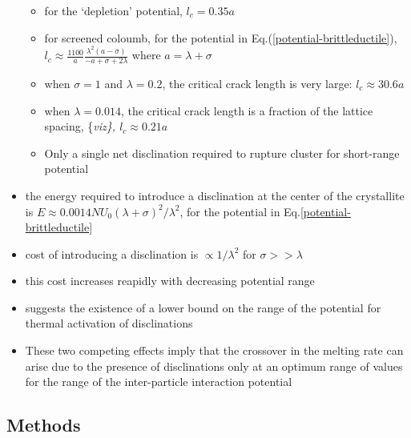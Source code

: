 \documentclass[11pt]{article}
\begin{document}
\begin{itemize}
\begin{itemize}
\item for the `depletion' potential, $l_c=0.35 a$\\
\label{sec-3-1-5-8-1}%
\item for screened coloumb, for the potential in Eq.(\ref{potential-brittleductile}), $l_c \approx \frac{1100}{a} \frac{\lambda^2 (a-\sigma)}{-a+\sigma+2\lambda}$ where $a=\lambda+\sigma$\\
\label{sec-3-1-5-8-2}%
\item when  $\sigma=1$ and $\lambda=0.2$,  the critical crack length  is very large: $l_c \approx 30.6 a$\\
\label{sec-3-1-5-8-3}%
\item when $\lambda=0.014$, the critical crack length is a fraction of the lattice spacing, \{\it viz\}, $l_c \approx 0.21a$\\
\label{sec-3-1-5-8-4}%
\item Only a single net disclination required to rupture cluster for short-range potential\\
\label{sec-3-1-5-8-5}%
\end{itemize} %

\item the energy required to introduce a disclination at the center of the crystallite is $E \approx 0.0014 N U_0 (\lambda + \sigma)^2/\lambda^2$, for the potential in Eq.\ref{potential-brittleductile}\\
\label{sec-3-1-5-9}%
\item cost of introducing a disclination is $\propto 1/\lambda^2$ for  $\sigma >> \lambda$\\
\label{sec-3-1-5-10}%
\item this cost increases reapidly with decreasing potential range\\
\label{sec-3-1-5-11}%
\item suggests the existence of a lower bound on the range of the potential for thermal activation of disclinations\\
\label{sec-3-1-5-12}%
\item These two competing effects imply that the crossover in the melting rate can arise due to the presence of disclinations only at an optimum range of values for the range of the inter-particle interaction potential\\
\label{sec-3-1-5-13}%
\end{itemize} %
\subsection{Methods}
\label{sec-3-2}
\end{document}
